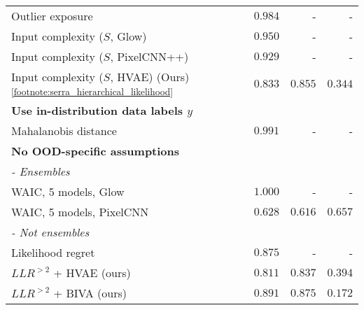 {\begin{table}[t!]
{\begin{tabular}{lrrr}
Outlier exposure {\parencite{hendrycks_deep_2019}}                              & $0.984$ & - & - \\
Input complexity ($S$, Glow) \parencite{serra_input_2020}                   & $0.950$ & - & - \\
Input complexity ($S$, PixelCNN++) \parencite{serra_input_2020}             & $0.929$ & - & - \\
Input complexity ($S$, HVAE) (Ours) \parencite{serra_input_2020}\textsuperscript{\ref{footnote:serra_hierarchical_likelihood}} & $0.833$ & $0.855$ & $0.344$ \\
\multicolumn{4}{l}{\textbf{Use in-distribution data labels $y$}} \\
Mahalanobis distance {\parencite{lee_simple_2018}}                          & $0.991$ & - & -  \\
         \multicolumn{4}{l}{\textbf{No OOD-specific assumptions}} \\
         \multicolumn{4}{l}{\textit{- Ensembles}} \\
WAIC, 5 models, Glow {\parencite{choi_waic_2019}}                          & $1.000$ & - & - \\
WAIC, 5 models, PixelCNN {\parencite{ren_likelihood_2019}}                      & $0.628$ & $0.616$ & $0.657$ \\
         \multicolumn{4}{l}{\textit{- Not ensembles}} \\
Likelihood regret \parencite{xiao_likelihood_2020}                               & $0.875$ & - & - \\
$LLR^{>2}$ + HVAE (ours)                            & $0.811$ & $0.837$ & $0.394$ \\
$LLR^{>2}$ + BIVA (ours)                            & $\mathbf{0.891}$ & $\mathbf{0.875}$ & $\mathbf{0.172}$ \\
         \bottomrule
    \end{tabular}%
    }
    \label{tab_hierarchical:rocauc-ood}
\end{table}

\addtocounter{footnote}{1}



}
